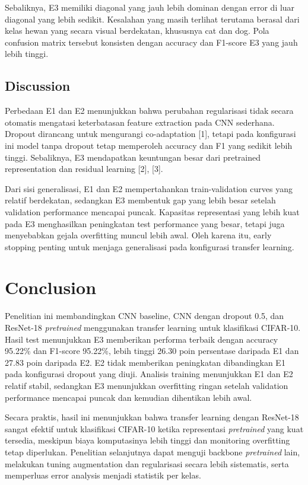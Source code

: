 \documentclass[conference,a4paper]{IEEEtran}
\begin{document}
Sebaliknya, E3 memiliki diagonal yang jauh lebih dominan dengan error di luar diagonal yang lebih sedikit. Kesalahan yang masih terlihat terutama berasal dari kelas hewan yang secara visual berdekatan, khususnya cat dan dog. Pola confusion matrix tersebut konsisten dengan accuracy dan F1-score E3 yang jauh lebih tinggi.

\subsection{Discussion}
Perbedaan E1 dan E2 menunjukkan bahwa perubahan regularisasi tidak secara otomatis mengatasi keterbatasan feature extraction pada CNN sederhana. Dropout dirancang untuk mengurangi co-adaptation [1], tetapi pada konfigurasi ini model tanpa dropout tetap memperoleh accuracy dan F1 yang sedikit lebih tinggi. Sebaliknya, E3 mendapatkan keuntungan besar dari pretrained representation dan residual learning [2], [3].

Dari sisi generalisasi, E1 dan E2 mempertahankan train-validation curves yang relatif berdekatan, sedangkan E3 membentuk gap yang lebih besar setelah validation performance mencapai puncak. Kapasitas representasi yang lebih kuat pada E3 menghasilkan peningkatan test performance yang besar, tetapi juga menyebabkan gejala overfitting muncul lebih awal. Oleh karena itu, early stopping penting untuk menjaga generalisasi pada konfigurasi transfer learning.

\section{Conclusion}
Penelitian ini membandingkan CNN baseline, CNN dengan dropout 0.5, dan ResNet-18 \textit{pretrained} menggunakan transfer learning untuk klasifikasi CIFAR-10. Hasil test menunjukkan E3 memberikan performa terbaik dengan accuracy 95.22\% dan F1-score 95.22\%, lebih tinggi 26.30 poin persentase daripada E1 dan 27.83 poin daripada E2. E2 tidak memberikan peningkatan dibandingkan E1 pada konfigurasi dropout yang diuji. Analisis training menunjukkan E1 dan E2 relatif stabil, sedangkan E3 menunjukkan overfitting ringan setelah validation performance mencapai puncak dan kemudian dihentikan lebih awal.

Secara praktis, hasil ini menunjukkan bahwa transfer learning dengan ResNet-18 sangat efektif untuk klasifikasi CIFAR-10 ketika representasi \textit{pretrained} yang kuat tersedia, meskipun biaya komputasinya lebih tinggi dan monitoring overfitting tetap diperlukan. Penelitian selanjutnya dapat menguji backbone \textit{pretrained} lain, melakukan tuning augmentation dan regularisasi secara lebih sistematis, serta memperluas error analysis menjadi statistik per kelas.
\end{document}
